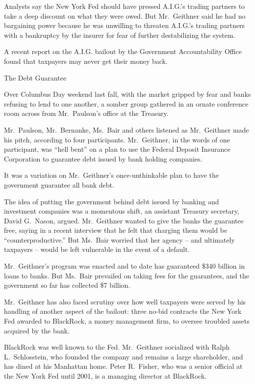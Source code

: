 \documentclass[12pt,a4paper,onecolumn]{article}
\begin{document}
Analysts say the New York Fed should have pressed A.I.G.'s trading partners to take a deep discount
on what they were owed. But Mr.~Geithner said he had no bargaining power because he was unwilling to
threaten A.I.G.'s trading partners with a bankruptcy by the insurer for fear of further
destabilizing the system.

A recent report on the A.I.G. bailout by the Government Accountability Office found that taxpayers
may never get their money back.

The Debt Guarantee

Over Columbus Day weekend last fall, with the market gripped by fear and banks refusing to lend to
one another, a somber group gathered in an ornate conference room across from Mr.~Paulson's office
at the Treasury.

Mr.~Paulson, Mr.~Bernanke, Ms.~Bair and others listened as Mr.~Geithner made his pitch, according to
four participants. Mr.~Geithner, in the words of one participant, was ``hell bent'' on a plan to use
the Federal Deposit Insurance Corporation to guarantee debt issued by bank holding companies.

It was a variation on Mr.~Geithner's once-unthinkable plan to have the government guarantee all bank
debt.

The idea of putting the government behind debt issued by banking and investment companies was a
momentous shift, an assistant Treasury secretary, David G.~Nason, argued. Mr.~Geithner wanted to
give the banks the guarantee free, saying in a recent interview that he felt that charging them
would be ``counterproductive.'' But Ms.~Bair worried that her agency -- and ultimately taxpayers --
would be left vulnerable in the event of a default.

Mr.~Geithner's program was enacted and to date has guaranteed \$340 billion in loans to banks. But
Ms.~Bair prevailed on taking fees for the guarantees, and the government so far has collected \$7
billion.

Mr.~Geithner has also faced scrutiny over how well taxpayers were served by his handling of another
aspect of the bailout: three no-bid contracts the New York Fed awarded to BlackRock, a money
management firm, to oversee troubled assets acquired by the bank.

BlackRock was well known to the Fed. Mr.~Geithner socialized with Ralph L.~Schlosstein, who founded
the company and remains a large shareholder, and has dined at his Manhattan home. Peter R.~Fisher,
who was a senior official at the New York Fed until 2001, is a managing director at BlackRock.
\end{document}
